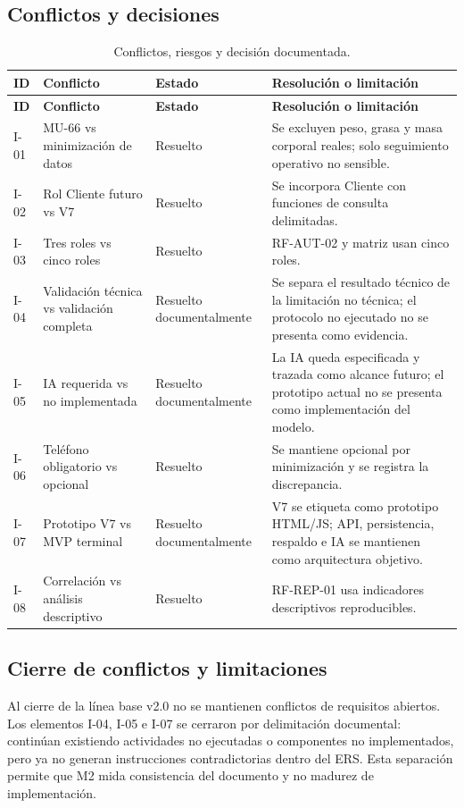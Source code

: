 \subsection{Conflictos y decisiones}
\begin{longtable}{|p{1.3cm}|p{4.4cm}|p{2.8cm}|p{7.2cm}|}
\caption{Conflictos, riesgos y decisión documentada.}\\\hline
\textbf{ID} & \textbf{Conflicto} & \textbf{Estado} & \textbf{Resolución o limitación}\\\hline\endfirsthead
\hline\textbf{ID} & \textbf{Conflicto} & \textbf{Estado} & \textbf{Resolución o limitación}\\\hline\endhead
I-01 & MU-66 vs minimización de datos & Resuelto & Se excluyen peso, grasa y masa corporal reales; solo seguimiento operativo no sensible. \\ \hline
I-02 & Rol Cliente futuro vs V7 & Resuelto & Se incorpora Cliente con funciones de consulta delimitadas. \\ \hline
I-03 & Tres roles vs cinco roles & Resuelto & RF-AUT-02 y matriz usan cinco roles. \\ \hline
I-04 & Validación técnica vs validación completa & Resuelto documentalmente & Se separa el resultado técnico de la limitación no técnica; el protocolo no ejecutado no se presenta como evidencia. \\ \hline
I-05 & IA requerida vs no implementada & Resuelto documentalmente & La IA queda especificada y trazada como alcance futuro; el prototipo actual no se presenta como implementación del modelo. \\ \hline
I-06 & Teléfono obligatorio vs opcional & Resuelto & Se mantiene opcional por minimización y se registra la discrepancia. \\ \hline
I-07 & Prototipo V7 vs MVP terminal & Resuelto documentalmente & V7 se etiqueta como prototipo HTML/JS; API, persistencia, respaldo e IA se mantienen como arquitectura objetivo. \\ \hline
I-08 & Correlación vs análisis descriptivo & Resuelto & RF-REP-01 usa indicadores descriptivos reproducibles. \\ \hline
\end{longtable}


\subsection{Cierre de conflictos y limitaciones}
Al cierre de la línea base v2.0 no se mantienen conflictos de requisitos abiertos. Los elementos I-04, I-05 e I-07 se cerraron por delimitación documental: continúan existiendo actividades no ejecutadas o componentes no implementados, pero ya no generan instrucciones contradictorias dentro del ERS. Esta separación permite que M2 mida consistencia del documento y no madurez de implementación.

